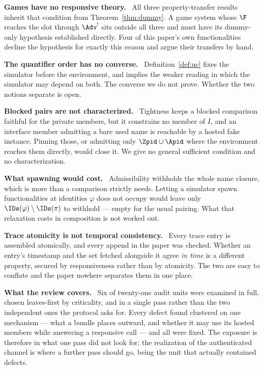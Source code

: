 \documentclass[10pt,oneside,openany]{book}
\newcommand{\heading}[1]{\medskip\par\noindent\textcolor{accent}{\textbf{#1.}}\ }
\theoremstyle{accentdef}
\theoremstyle{accentplain}
\begin{document}
\heading{Games have no responsive theory} All three property-transfer results inherit that
condition from Theorem~\ref{thm:dummy}. A game system whose $\F$ reaches the slot through
$\Adv^{!}$ sits outside all three and must have its dummy-only hypothesis established directly.
Four of this paper's own functionalities decline the hypothesis for exactly this reason and argue
their transfers by hand.

\heading{The quantifier order has no converse} Definition~\ref{def:uc} fixes the simulator before
the environment, and implies the weaker reading in which the simulator may depend on both. The
converse we do not prove. Whether the two notions separate is open.

\heading{Blocked pairs are not characterized} Tightness keeps a blocked comparison faithful for the
private members, but it constrains no member of $I$, and an interface member admitting a bare used
name is reachable by a hosted fake instance. Pinning those, or admitting only
$\Zpid \cup \Apid$ where the environment reaches them directly, would close it. We give no general
sufficient condition and no characterization.

\heading{What spawning would cost} Admissibility withholds the whole name closure, which is more
than a comparison strictly needs. Letting a simulator spawn functionalities at identities $\varphi$
does not occupy would leave only $\IDs(\varphi) \setminus \IDs(\pi)$ to withhold --- empty for the
usual pairing. What that relaxation costs in composition is not worked out.

\heading{Trace atomicity is not temporal consistency} Every trace entry is assembled atomically,
and every append in the paper was checked. Whether an entry's timestamp and the set fetched
alongside it agree \emph{in time} is a different property, secured by responsiveness rather than by
atomicity. The two are easy to conflate and the paper nowhere separates them in one place.

\heading{What the review covers} Six of twenty-one audit units were examined in full, chosen
leaves-first by criticality, and in a single pass rather than the two independent ones the protocol
asks for. Every defect found clustered on one mechanism --- what a bundle places outward, and
whether it may use its hosted members while answering a responsive call --- and all were fixed.
The exposure is therefore in what one pass did not look for; the realization of the authenticated
channel is where a further pass should go, being the unit that actually contained defects.
\end{document}
